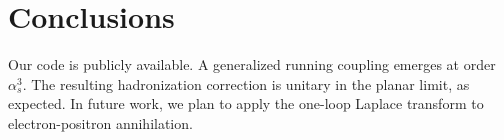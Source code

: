 \section{Conclusions}\label{sec:conclusions}

Our code is publicly available. A generalized running coupling emerges
at order $\alpha_s^3$. The resulting hadronization correction is unitary
in the planar limit, as expected. In future work, we plan to apply the
one-loop Laplace transform to electron-positron annihilation.

